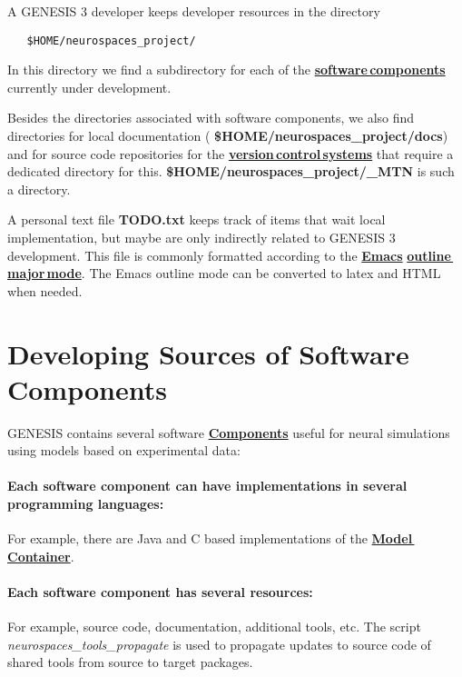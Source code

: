 \documentclass[12pt]{article}
\begin{document}
A GENESIS 3 developer keeps developer resources in the directory

\begin{verbatim}
   $HOME/neurospaces_project/
\end{verbatim}

In this directory we find a subdirectory for each of the
\href{../genesis-components/genesis-components.tex}{\bf software\,components} currently under development.

Besides the directories associated with software components, we also
find directories for local documentation ({\bf
  \$HOME/neurospaces\_project/docs}) and for source code repositories
for the \href{../version-control/version-control.tex}{\bf version\,control\,systems} 
that require a dedicated directory for this.  {\bf
  \$HOME/neurospaces\_project/\_MTN} is such a directory.

A personal text file {\bf TODO.txt} keeps track of items that wait
local implementation, but maybe are only indirectly related to GENESIS
3 development.  This file is commonly formatted according to the
\href{http://www.gnu.org/software/emacs/}{\bf Emacs}
\href{http://www.emacswiki.org/emacs/OutlineMode}{\bf outline\,major\,mode}.
The Emacs outline mode can be converted to latex and HTML when needed.


\section*{Developing Sources of Software Components}


GENESIS contains several software \href{../reserved-words/reserved-words.tex}{\bf Components} useful for neural simulations using models based on experimental data:
\paragraph{\bf Each software component can have implementations in several programming languages:} For example, there are Java and C based implementations of the \href{../model-container/model-container.tex}{\bf Model\,Container}.
\paragraph{\bf Each software component has several resources:} For example, source code, documentation, additional tools, etc.  The script {\it neurospaces\_tools\_propagate} is used to propagate updates to source code of shared tools from source to target packages.
\end{document}
